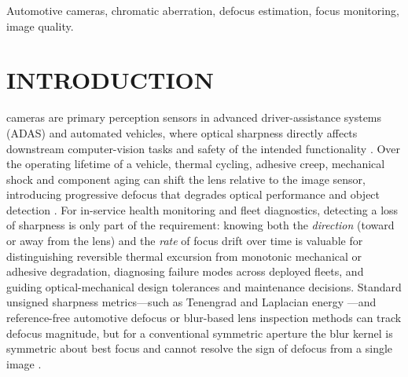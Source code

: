 \documentclass{ieee-ojvt}
\begin{document}
\begin{IEEEkeywords}
Automotive cameras, chromatic aberration, defocus estimation, focus monitoring, image quality.
\end{IEEEkeywords}

\maketitle

\section{INTRODUCTION}
 cameras are primary perception sensors in advanced driver-assistance systems (ADAS) and automated vehicles, where optical sharpness directly affects downstream computer-vision tasks \cite{jakab2026optical,ieee2020_2024} and safety of the intended functionality \cite{iso26262_2018,iso21448_2022}. Over the operating lifetime of a vehicle, thermal cycling, adhesive creep, mechanical shock and component aging can shift the lens relative to the image sensor, introducing progressive defocus that degrades optical performance and object detection \cite{pandey2025age,pandey2026aging}. For in-service health monitoring and fleet diagnostics, detecting a loss of sharpness is only part of the requirement: knowing both the \emph{direction} (toward or away from the lens) and the \emph{rate} of focus drift over time is valuable for distinguishing reversible thermal excursion from monotonic mechanical or adhesive degradation, diagnosing failure modes across deployed fleets, and guiding optical-mechanical design tolerances and maintenance decisions. Standard unsigned sharpness metrics---such as Tenengrad and Laplacian energy \cite{pertuz2013analysis}---and reference-free automotive defocus or blur-based lens inspection methods \cite{wang2022local,jakab2024ardan} can track defocus magnitude, but for a conventional symmetric aperture the blur kernel is symmetric about best focus and cannot resolve the sign of defocus from a single image \cite{pentland1987new}.
\end{document}
